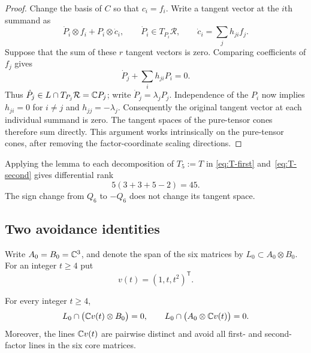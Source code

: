 \begin{proof}
Change the basis of $C$ so that $c_i=f_i$. Write a tangent vector at
the $i$th summand as
\[
 \dot P_i\otimes f_i+P_i\otimes\dot c_i,
 \qquad \dot P_i\in T_{P_i}\mathcal R,
 \qquad \dot c_i=\sum_j h_{ji}f_j.
\]
Suppose that the sum of these $r$ tangent vectors is zero. Comparing
coefficients of $f_j$ gives
\[
 \dot P_j+\sum_i h_{ji}P_i=0.
\]
Thus $\dot P_j\in L\cap T_{P_j}\mathcal R=\mathbb C P_j$; write
$\dot P_j=\lambda_jP_j$. Independence of the $P_i$ now implies
$h_{ji}=0$ for $i\ne j$ and $h_{jj}=-\lambda_j$. Consequently the
original tangent vector at each individual summand is zero.
The tangent spaces of the pure-tensor cones therefore sum directly.
This argument works intrinsically on the pure-tensor cones, after
removing the factor-coordinate scaling directions.
\end{proof}

Applying the lemma to each decomposition of $T_5:=T$ in
\eqref{eq:T-first} and~\eqref{eq:T-second} gives differential rank
\begin{equation}\label{eq:rank45}
 5(3+3+5-2)=45.
\end{equation}
The sign change from $Q_6$ to $-Q_6$ does not change its tangent space.

\subsection{Two avoidance identities}

Write $A_0=B_0=\mathbb C^3$, and denote the span of the six matrices by
$L_0\subset A_0\otimes B_0$. For an integer $t\geq4$ put
\[
 v(t)=(1,t,t^2)^{\mathsf T}.
\]

\begin{lemma}\label{lemma:avoidance}
For every integer $t\geq4$,
\begin{equation}\label{eq:avoidance}
 L_0\cap\bigl(\mathbb C v(t)\otimes B_0\bigr)=0,
 \qquad
 L_0\cap\bigl(A_0\otimes\mathbb C v(t)\bigr)=0.
\end{equation}
Moreover, the lines $\mathbb C v(t)$ are pairwise distinct and avoid all
first- and second-factor lines in the six core matrices.
\end{lemma}

